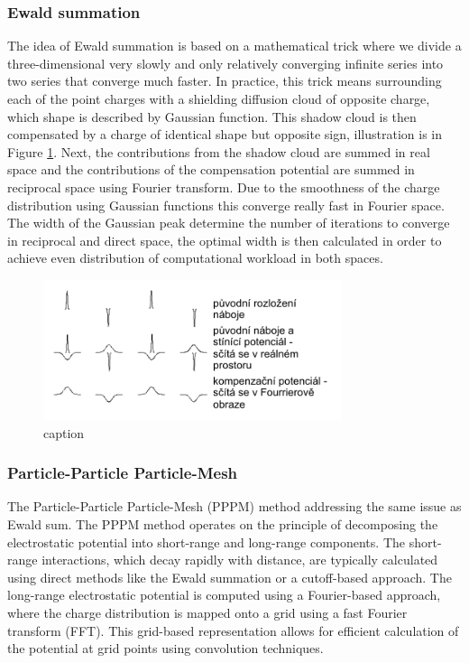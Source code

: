 \subsubsection{Ewald summation}
The idea of Ewald summation is based on a mathematical trick where we divide a three-dimensional very slowly and only relatively converging infinite series into two series that converge much faster. In practice, this trick means surrounding each of the point charges with a shielding diffusion cloud of opposite charge, which shape is described by Gaussian function. This shadow cloud is then compensated by a charge of identical shape but opposite sign, illustration is in Figure \ref{fig:ewald}. Next, the contributions from the shadow cloud are summed in real space and the contributions of the compensation potential are summed in reciprocal space using Fourier transform. Due to the smoothness of the charge distribution using Gaussian functions this converge really fast in Fourier space. The width of the Gaussian peak determine the number of iterations to converge in reciprocal and direct space, the optimal width is then calculated in order to achieve even distribution of computational workload in both spaces. \cite{Sritterova}


\begin{figure}[htb!]
	\centering
	\includegraphics[width=0.9\linewidth]{img/ewald.png} 
	\caption{caption}
	\label{fig:ewald}    
\end{figure} 

\subsubsection{Particle-Particle Particle-Mesh}
The Particle-Particle Particle-Mesh (PPPM) method addressing the same issue as Ewald sum. The PPPM method operates on the principle of decomposing the electrostatic potential into short-range and long-range components. The short-range interactions, which decay rapidly with distance, are typically calculated using direct methods like the Ewald summation or a cutoff-based approach. The long-range electrostatic potential is computed using a Fourier-based approach, where the charge distribution is mapped onto a grid using a fast Fourier transform (FFT). This grid-based representation allows for efficient calculation of the potential at grid points using convolution techniques. \cite{Sritterova}


